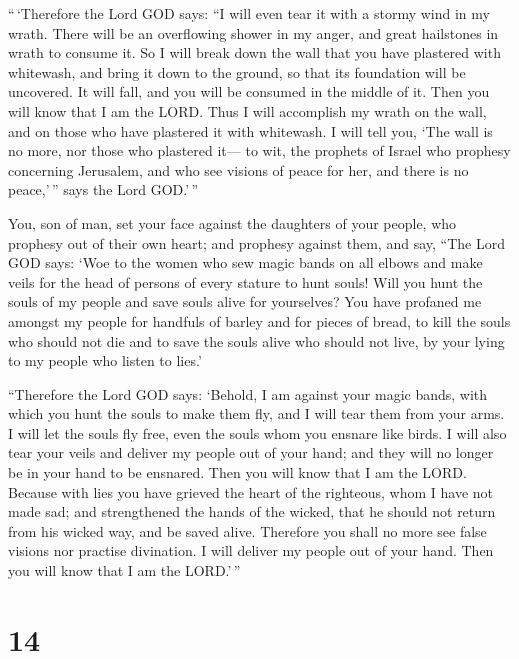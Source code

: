  ``\,`Therefore the Lord GOD says: ``I will even tear it
with a stormy wind in my wrath. There will be an overflowing shower in
my anger, and great hailstones in wrath to consume it.  So
I will break down the wall that you have plastered with whitewash, and
bring it down to the ground, so that its foundation will be uncovered.
It will fall, and you will be consumed in the middle of it. Then you
will know that I am the LORD.  Thus I will accomplish my
wrath on the wall, and on those who have plastered it with whitewash. I
will tell you, `The wall is no more, nor those who plastered it---
 to wit, the prophets of Israel who prophesy concerning
Jerusalem, and who see visions of peace for her, and there is no
peace,'\,'' says the Lord GOD.'\,''

 You, son of man, set your face against the daughters of
your people, who prophesy out of their own heart; and prophesy against
them,  and say, ``The Lord GOD says: `Woe to the women who
sew magic bands on all elbows and make veils for the head of persons of
every stature to hunt souls! Will you hunt the souls of my people and
save souls alive for yourselves?  You have profaned me
amongst my people for handfuls of barley and for pieces of bread, to
kill the souls who should not die and to save the souls alive who should
not live, by your lying to my people who listen to lies.'

 ``Therefore the Lord GOD says: `Behold, I am against your
magic bands, with which you hunt the souls to make them fly, and I will
tear them from your arms. I will let the souls fly free, even the souls
whom you ensnare like birds.  I will also tear your veils
and deliver my people out of your hand; and they will no longer be in
your hand to be ensnared. Then you will know that I am the LORD.
 Because with lies you have grieved the heart of the
righteous, whom I have not made sad; and strengthened the hands of the
wicked, that he should not return from his wicked way, and be saved
alive.  Therefore you shall no more see false visions nor
practise divination. I will deliver my people out of your hand. Then you
will know that I am the LORD.'\,''

\hypertarget{section-12}{%
\section{14}\label{section-12}}

